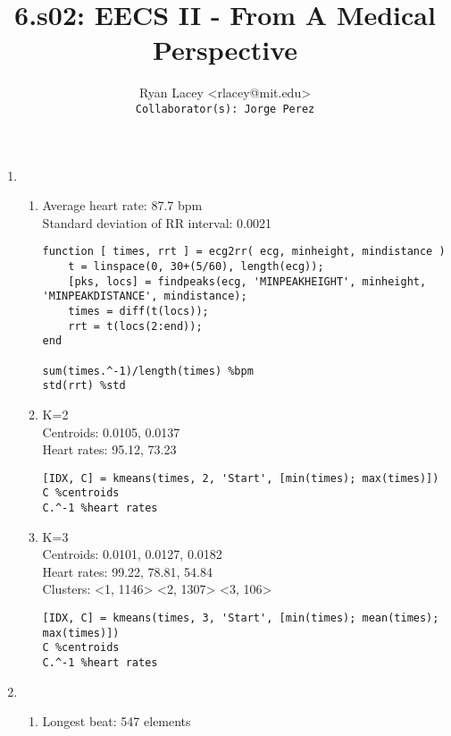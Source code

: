 \documentclass{article}
\begin{document}

\title{6.s02: EECS II - From A Medical Perspective}
\author{
  Ryan Lacey <rlacey@mit.edu>\\
  \footnotesize \texttt{Collaborator(s): Jorge Perez}
}
        
\maketitle
        


\begin{enumerate}
\item[1.]
	\begin{enumerate}
	\item[(a)]
		Average heart rate: 87.7 bpm\\
		Standard deviation of RR interval: 0.0021\\
\begin{lstlisting}   
function [ times, rrt ] = ecg2rr( ecg, minheight, mindistance )
    t = linspace(0, 30+(5/60), length(ecg));
    [pks, locs] = findpeaks(ecg, 'MINPEAKHEIGHT', minheight, 'MINPEAKDISTANCE', mindistance);
    times = diff(t(locs));
    rrt = t(locs(2:end));
end

sum(times.^-1)/length(times) %bpm
std(rrt) %std
\end{lstlisting}

\bigskip

	\item[(b)]
		K=2\\
		Centroids: 0.0105, 0.0137\\
		Heart rates: 95.12, 73.23\\
\begin{lstlisting}   
[IDX, C] = kmeans(times, 2, 'Start', [min(times); max(times)])
C %centroids
C.^-1 %heart rates
\end{lstlisting}

\bigskip

	\item[(c)]
		K=3\\
		Centroids: 0.0101, 0.0127, 0.0182\\
		Heart rates: 99.22, 78.81, 54.84\\
		Clusters: <1, 1146> <2, 1307> <3, 106>\\
\begin{lstlisting}   
[IDX, C] = kmeans(times, 3, 'Start', [min(times); mean(times); max(times)])
C %centroids
C.^-1 %heart rates
\end{lstlisting}
	\end{enumerate}

\newpage

\item[2.]
	\begin{enumerate}
	\item[(a)]
		Longest beat: 547 elements
	\end{enumerate}
\end{enumerate}
\end{document}
